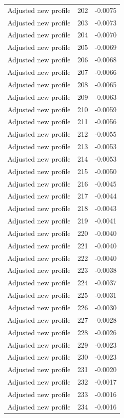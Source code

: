 \begin{table}[htbp]
\begin{tabular}{lll}
Adjusted new profile & 202 & -0.0075 \\
Adjusted new profile & 203 & -0.0073 \\
Adjusted new profile & 204 & -0.0070 \\
Adjusted new profile & 205 & -0.0069 \\
Adjusted new profile & 206 & -0.0068 \\
Adjusted new profile & 207 & -0.0066 \\
Adjusted new profile & 208 & -0.0065 \\
Adjusted new profile & 209 & -0.0063 \\
Adjusted new profile & 210 & -0.0059 \\
Adjusted new profile & 211 & -0.0056 \\
Adjusted new profile & 212 & -0.0055 \\
Adjusted new profile & 213 & -0.0053 \\
Adjusted new profile & 214 & -0.0053 \\
Adjusted new profile & 215 & -0.0050 \\
Adjusted new profile & 216 & -0.0045 \\
Adjusted new profile & 217 & -0.0044 \\
Adjusted new profile & 218 & -0.0043 \\
Adjusted new profile & 219 & -0.0041 \\
Adjusted new profile & 220 & -0.0040 \\
Adjusted new profile & 221 & -0.0040 \\
Adjusted new profile & 222 & -0.0040 \\
Adjusted new profile & 223 & -0.0038 \\
Adjusted new profile & 224 & -0.0037 \\
Adjusted new profile & 225 & -0.0031 \\
Adjusted new profile & 226 & -0.0030 \\
Adjusted new profile & 227 & -0.0028 \\
Adjusted new profile & 228 & -0.0026 \\
Adjusted new profile & 229 & -0.0023 \\
Adjusted new profile & 230 & -0.0023 \\
Adjusted new profile & 231 & -0.0020 \\
Adjusted new profile & 232 & -0.0017 \\
Adjusted new profile & 233 & -0.0016 \\
Adjusted new profile & 234 & -0.0016 \\

\end{tabular}
\end{table}
